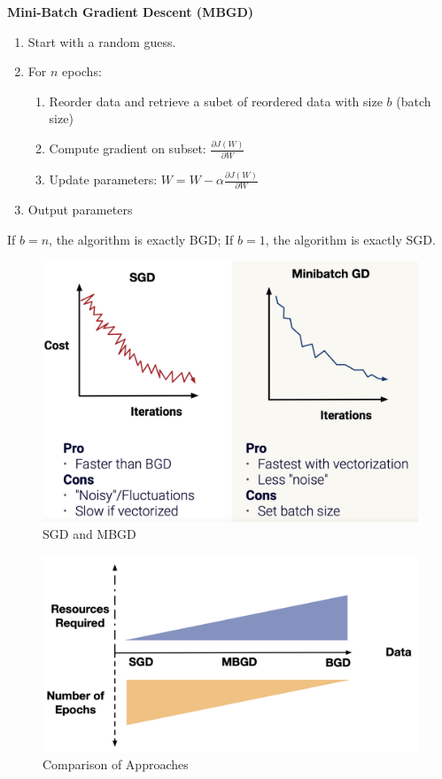 \documentclass[11pt,a4paper]{article}
\begin{document}
\textbf{Mini-Batch Gradient Descent (MBGD)}
\begin{enumerate}
    \item Start with a random guess.
    \item For $n$ epochs:
    \begin{enumerate}[1)]
        \item Reorder data and retrieve a subet of reordered data with size $b$ (batch size)
        \item Compute gradient on subset: $\frac{\partial J(W)}{\partial W}$
        \item Update parameters:
        $W=W-\alpha \frac{\partial J(W)}{\partial W}$
    \end{enumerate}
    \item Output parameters
\end{enumerate}
If $b=n$, the algorithm is exactly BGD; If $b=1$, the algorithm is exactly SGD.
\begin{center}\begin{figure}[htbp]
    \centering
    \includegraphics[scale=0.1]{SGDandMBGD.png}
    \caption{SGD and MBGD}
    \label{}
\end{figure}\end{center}

\begin{center}\begin{figure}[htbp]
    \centering
    \includegraphics[scale=0.1]{resource.png}
    \caption{Comparison of Approaches}
    \label{}
\end{figure}\end{center}
\end{document}
